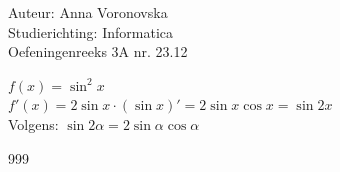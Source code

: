 \documentclass[a4paper]{article}
\begin{document}
\noindent \large Auteur: Anna Voronovska \\
\noindent \large Studierichting: Informatica \\
\noindent \large Oefeningenreeks 3A nr. 23.12 \\

\medskip 

\normalsize

$f(x) = \sin^2 x$\\

$f'(x) = 2 \sin x \cdot (\sin x)'= 2 \sin x \cos x= \sin 2x$\\

Volgens: $ \sin 2\alpha = 2 \sin \alpha \cos \alpha $\\ 


\begin{thebibliography}{999}
\end{thebibliography}
\end{document}
